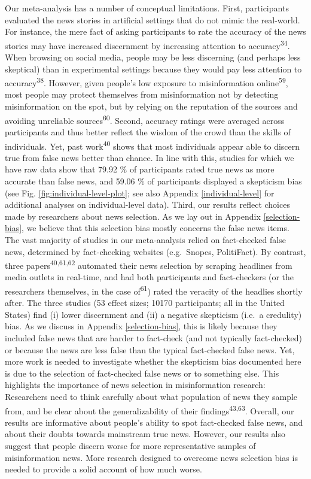 \documentclass[
  man]{apa6}
\begin{document}
Our meta-analysis has a number of conceptual limitations. First, participants evaluated the news stories in artificial settings that do not mimic the real-world. For instance, the mere fact of asking participants to rate the accuracy of the news stories may have increased discernment by increasing attention to accuracy\textsuperscript{34}. When browsing on social media, people may be less discerning (and perhaps less skeptical) than in experimental settings because they would pay less attention to accuracy\textsuperscript{38}. However, given people's low exposure to misinformation online\textsuperscript{59}, most people may protect themselves from misinformation not by detecting misinformation on the spot, but by relying on the reputation of the sources and avoiding unreliable sources\textsuperscript{60}. Second, accuracy ratings were averaged across participants and thus better reflect the wisdom of the crowd than the skills of individuals. Yet, past work\textsuperscript{40} shows that most individuals appear able to discern true from false news better than chance. In line with this, studies for which we have raw data show that 79.92 \% of participants rated true news as more accurate than false news, and 59.06 \% of participants displayed a skepticism bias (see Fig. \ref{fig:individual-level-plot}; see also Appendix \ref{individual-level} for additional analyses on individual-level data). Third, our results reflect choices made by researchers about news selection. As we lay out in Appendix \ref{selection-bias}, we believe that this selection bias mostly concerns the false news items. The vast majority of studies in our meta-analysis relied on fact-checked false news, determined by fact-checking websites (e.g.~Snopes, PolitiFact). By contrast, three papers\textsuperscript{40,61,62} automated their news selection by scraping headlines from media outlets in real-time, and had both participants and fact-checkers (or the researchers themselves, in the case of\textsuperscript{61}) rated the veracity of the headlies shortly after. The three studies (53 effect sizes; 10170 participants; all in the United States) find (i) lower discernment and (ii) a negative skepticism (i.e.~a credulity) bias. As we discuss in Appendix \ref{selection-bias}, this is likely because they included false news that are harder to fact-check (and not typically fact-checked) or because the news are less false than the typical fact-checked false news. Yet, more work is needed to investigate whether the skepticism bias documented here is due to the selection of fact-checked false news or to something else. This highlights the importance of news selection in misinformation research: Researchers need to think carefully about what population of news they sample from, and be clear about the generalizability of their findings\textsuperscript{43,63}. Overall, our results are informative about people's ability to spot fact-checked false news, and about their doubts towards mainstream true news. However, our results also suggest that people discern worse for more representative samples of misinformation news. More research designed to overcome news selection bias is needed to provide a solid account of how much worse.
\end{document}
